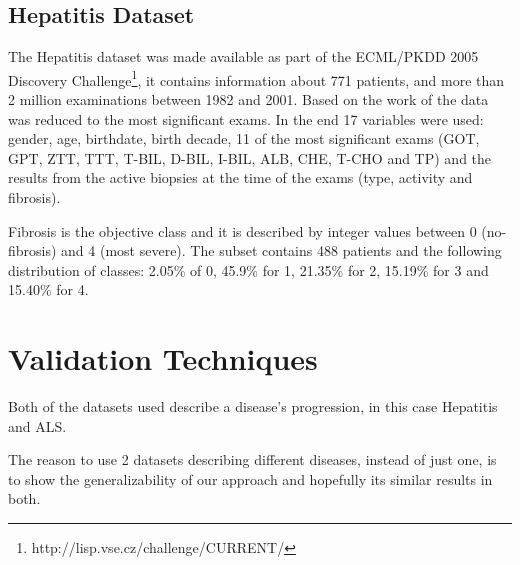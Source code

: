 \subsection{Hepatitis Dataset}
\label{subsection:hepatitis}

The Hepatitis dataset was made available as part of the ECML/PKDD 2005 Discovery 
Challenge\footnote{http://lisp.vse.cz/challenge/CURRENT/}, it contains information about
 771 patients, and more than 2 million examinations between 1982 and 2001. Based on the work of \cite{Watanabe2003}
 the data was reduced to the most significant exams. In the end 17 variables were used: gender, age, birthdate, birth decade, 
 11 of the most significant exams (GOT, GPT, ZTT, TTT, T-BIL, D-BIL, I-BIL, ALB, CHE, T-CHO and TP) and the results from the
 active biopsies at the time of the exams (type, activity and fibrosis).

Fibrosis is the objective class and it is described by integer values between 0 (no-fibrosis) and 4 (most severe).
 The subset contains 488 patients and the following distribution of 
 classes: 2.05\% of 0, 45.9\% for 1, 21.35\% for 2, 15.19\% for 3 and 15.40\% for 4.




 \section{Validation Techniques}
\label{section:validation}

Both of the datasets used describe a disease’s progression, in this case Hepatitis and ALS. 

The reason to use 2 datasets describing different diseases, instead of just one, is to show the generalizability of our approach and hopefully
its similar results in both.


